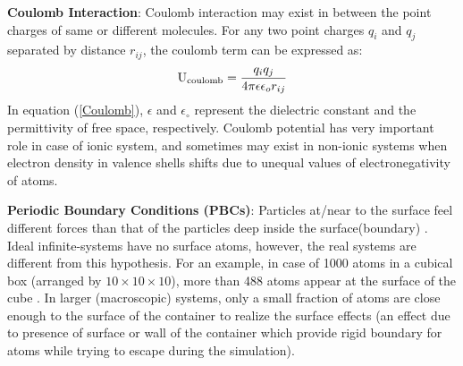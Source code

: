 {\textbf{Coulomb Interaction}}: 
Coulomb interaction may exist in between the point charges of same or different molecules. For any two
point charges $q_i$ and $q_j$ separated by distance $r_{ij}$, the coulomb term can be expressed as:
\begin{equation}
\textrm{{U}}_{\rm coulomb} = \frac{q_iq_j}{4\pi\epsilon\epsilon_or_{ij}}
\label{Coulomb}
\end{equation}
In equation (\ref{Coulomb}), $\epsilon$ and  $\epsilon_\circ$ represent the dielectric constant and the permittivity of free space, respectively. Coulomb potential has very important role in case of ionic system, and sometimes may exist in non-ionic systems when electron density in valence shells shifts due to unequal values of electronegativity of atoms.

\begin{sloppypar}
{\textbf{Periodic Boundary Conditions (PBCs)}}: Particles at/near to the surface feel different forces than that of the particles deep inside the surface(boundary) \citep{Allen1989}. Ideal infinite-systems have no surface atoms, however, the real systems are different from this hypothesis. For an example, in case of 1000 atoms in a cubical box (arranged by $10\times10\times10$), more than 488 atoms appear at the surface of the cube \citep{Allen1989}. In larger (macroscopic) systems, only a small fraction of atoms are close enough to the surface of the container to realize the surface effects (an effect due to presence of surface or wall of the container which provide rigid boundary for atoms while trying to escape during the simulation). 
\end{sloppypar}

